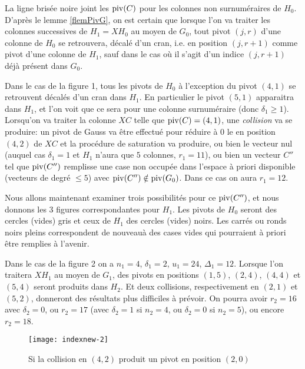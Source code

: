  
La ligne brisée noire joint les
$\mathrm{piv}(C)$ pour les colonnes non surnuméraires de $H_0$. \\
D'après le lemme  \ref{flemPivG}, on est certain que lorsque l'on va traiter
les colonnes successives de $H_1=XH_0$ au moyen de $G_0$, 
tout pivot  $(j,r)$ d'une colonne de $H_0$ se retrouvera, décalé d'un cran,
i.e. en position $(j,r+1)$ comme pivot 
d'une colonne  de $H_1$, sauf dans le cas où il s'agit d'un indice
$(j,r+1)$  déjà présent dans $G_0$.



Dans le cas de la figure 1, tous les pivots de $H_0$ à l'exception du pivot $(4,1)$ se retrouvent décalés d'un cran dans $H_1$. En particulier le pivot $(5,1)$ apparaitra dans $H_1$,
et l'on voit que ce sera
pour une colonne surnuméraire (donc $\delta_1\geq 1$).
\\
Lorsqu'on va traiter la
colonne $XC$ telle que $\mathrm{piv}(C)=(4,1)$, une \textsl{collision} va se produire: 
un pivot de Gauss va \^etre effectué
pour réduire à $0$ le \coe en position $(4,2)$ de $XC$
et  la procédure de saturation va produire, ou bien le vecteur nul
(auquel cas $\delta_1=1$ et $H_1$ n'aura que $5$ colonnes, $r_1=11$), ou bien un vecteur $C''$ tel que $\mathrm{piv}(C'')$ remplisse une case
non occupée dans l'espace à priori disponible (vecteurs de degré $\leq 5$)
avec \ncrt  $\mathrm{piv}(C'')\notin \mathrm{piv}(G_0)$.
Dans ce cas on aura $r_1=12$. 


Nous allons maintenant examiner trois possibilités pour ce $\mathrm{piv}(C'')$, et nous donnons les 3 figures correspondantes pour $H_1$.
Les pivots de $H_0$ seront des cercles (vides) gris et ceux de $H_1$ des cercles (vides) noirs. 
Les carrés ou ronds noirs pleins correspondent 
de nouveauà des cases vides qui pourraient à priori
\^etre remplies à l'avenir.



Dans le cas de la figure 2 on a  $n_1=4$, $\delta_1=2$, $u_1=24$, 
$\Delta_1=12$.
Lorsque l'on traitera $XH_1$ au moyen de $G_1$,
des pivots en positions $(1,5)$, $(2,4)$, $(4,4)$ et $(5,4)$
seront produits dans $H_2$. Et deux collisions, respectivement en $(2,1)$ et $(5,2)$, donneront des résultats plus difficiles à prévoir.
On pourra avoir $r_2=16$ avec $\delta_2=0$, ou  $r_2=17$ (avec $\delta_2=1$ si $n_2=4$, ou $\delta_2=0$ si $n_2=5$),
ou encore  $r_2=18$.

\begin{figure}[ht]   
%
\begin{center}
\texttt{[image: indexnew-2]}

\caption[figure 2]
{\label{ffig2} Si la collision en $(4,2)$ produit un pivot en position $(2,0)$ }

\end{center}
\end{figure}
	
